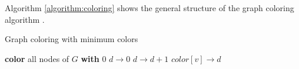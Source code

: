 Algorithm \autoref{algorithm:coloring} shows the general structure of the graph coloring algorithm  \cite{mittal2011graph} \cite{vernize2013dissertation}.

\begin{algorithm}
\caption{Graph coloring with minimum colors}\label{algorithm:coloring}
\begin{algorithmic}[1]


\State \textbf{color} all nodes of $G$ \textbf{with} 0
\State $d \rightarrow 0$
			\State $d \rightarrow d+1$
		\EndIf
		\State $color[v] \rightarrow d$
	\EndIf
\EndFor


\EndFunction
\end{algorithmic}
\end{algorithm}


